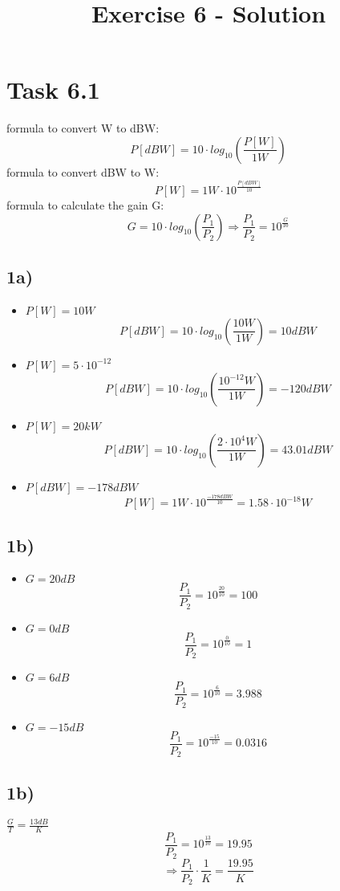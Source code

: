 \documentclass[a4paper,12pt]{article}
\title{Exercise 6 - Solution}
\author{}
\date{}
\begin{document}
\maketitle

\section*{Task 6.1}

formula to convert W to dBW: \[P[dBW] = 10\cdot log_{10}\left(\frac{P[W]}{1W}\right)\]
formula to convert dBW to W: \[P[W] = 1W\cdot 10^{\frac{P[dBW]}{10}}\]
formula to calculate the gain G: \[G = 10\cdot log_{10}\left(\frac{P_1}{P_2}\right) \Rightarrow \frac{P_1}{P_2} = 10^{\frac{G}{10}}\]

\subsection*{1a)}
\begin{itemize}
 \item $P[W] = 10W$ \[P[dBW] = 10\cdot log_{10}\left(\frac{10W}{1W}\right) = 10dBW\]
 \item $P[W] = 5\cdot 10^{-12}$ \[P[dBW] = 10\cdot log_{10}\left(\frac{10^{-12}W}{1W}\right) = -120dBW\]
 \item $P[W] = 20kW$ \[P[dBW] = 10\cdot log_{10}\left(\frac{2\cdot 10^4W}{1W}\right) = 43.01dBW\]
 \item $P[dBW] = -178dBW$ \[P[W] = 1W\cdot 10^{\frac{-178dBW}{10}} = 1.58\cdot 10^{-18}W\]
\end{itemize}

\subsection*{1b)}
\begin{itemize}
 \item $G = 20dB$ \[\frac{P_1}{P_2} = 10^{\frac{20}{10}} = 100\]
 \item $G = 0dB$ \[\frac{P_1}{P_2} = 10^{\frac{0}{10}} = 1\]
 \item $G = 6dB$ \[\frac{P_1}{P_2} = 10^{\frac{6}{10}} = 3.988\]
 \item $G = -15dB$ \[\frac{P_1}{P_2} = 10^{\frac{-15}{10}} = 0.0316\]
\end{itemize}

\subsection*{1b)}
$\frac{G}{T} = \frac{13dB}{K}$ \[\frac{P_1}{P_2} = 10^{\frac{13}{10}} = 19.95\] \[ \Rightarrow \frac{P_1}{P_2}\cdot \frac{1}{K} = \frac{19.95}{K}\]
\end{document}
